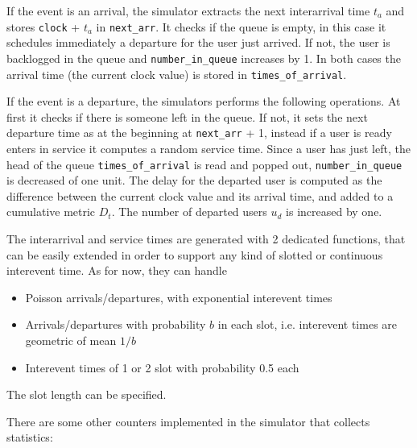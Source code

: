 \documentclass[10pt]{article}
\begin{document}
If the event is an arrival, the simulator extracts the next interarrival time $t_a$ and stores \texttt{clock} + $t_a$ in \texttt{next\_arr}. It checks if the queue is empty, in this case it schedules immediately a departure for the user just arrived. If not, the user is backlogged in the queue and \texttt{number\_in\_queue} increases by 1. In both cases the arrival time (the current clock value) is stored in \texttt{times\_of\_arrival}.

If the event is a departure, the simulators performs the following operations. At first it checks if there is someone left in the queue. If not, it sets the next departure time as at the beginning at \texttt{next\_arr} + 1, instead if a user is ready enters in service it computes a random service time. Since a user has just left, the head of the queue \texttt{times\_of\_arrival} is read and popped out, \texttt{number\_in\_queue} is decreased of one unit. The delay for the departed user is computed as the difference between the current clock value and its arrival time, and added to a cumulative metric $D_t$. The number of departed users $u_d$ is increased by one. 


The interarrival and service times are generated with 2 dedicated functions, that can be easily extended in order to support any kind of slotted or continuous interevent time. As for now, they can handle 
\begin{itemize}
\item Poisson arrivals/departures, with exponential interevent times 
\item Arrivals/departures with probability $b$ in each slot, i.e. interevent times are geometric of mean $1/b$
\item Interevent times of 1 or 2 slot with probability 0.5 each
\end{itemize}
The slot length can be specified.

There are some other counters implemented in the simulator that collects statistics:
\end{document}
